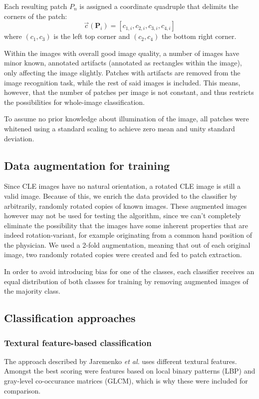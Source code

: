 \documentclass[fleqn,10pt]{wlscirep}
\begin{document}
Each resulting patch $P_n$ is assigned a coordinate quadruple
that delimits the corners of the patch:
\begin{equation}
\vec{c}(\textbf{P}_i)  = \left[ c_{1,i}, c_{2,i}, c_{3,i}, c_{4,i}\right]
\end{equation}
where $(c_1,c_3)$ is the left top corner and $(c_2,c_4)$ the bottom right corner.

Within the images with overall good image quality, a number of images have minor known, annotated
artifacts (annotated as rectangles within the image), only affecting the image slightly. Patches with artifacts are removed from the image
recognition task, while the rest of said images is included. This means, however, that the number of patches per
image is not constant, and thus restricts the possibilities for
whole-image classification.


To assume no prior knowledge about illumination of the image, all
patches were whitened using a standard scaling to achieve zero mean and
unity standard deviation.

\subsection{Data augmentation for training}
Since CLE images have no natural orientation, a rotated CLE image is
still a valid image. Because of this, we enrich the data provided to
the classifier by arbitrarily, randomly rotated copies of known images. These
augmented images however may not be used for testing the algorithm,
since we can't completely eliminate the possibility that the images
have some inherent properties that are indeed rotation-variant, for
example originating from a common hand position of the physician.  We
used a 2-fold augmentation, meaning that out of each original image, two randomly rotated
 copies were created and fed to patch extraction.

In order to avoid introducing bias for one of the classes, each classifier receives an equal
distribution of both classes for training by removing augmented images of the majority class.

\subsection{Classification approaches}
\vspace{0.5em}
\subsubsection{Textural feature-based classification}
The approach described by Jaremenko \textit{et al.}\cite{Jaremenko:2015kh} uses
different textural features. Amongst the best scoring were features
based on local binary
patterns (LBP) and gray-level co-occurance matrices (GLCM), which is why these were
included for comparison.
\end{document}
